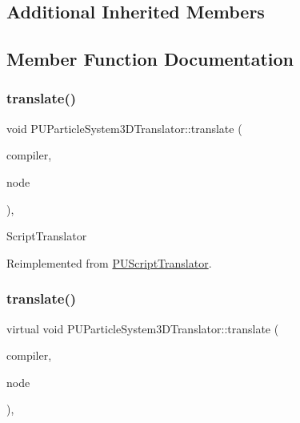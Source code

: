 \subsection*{Additional Inherited Members}


\subsection{Member Function Documentation}
\mbox{\label{classPUParticleSystem3DTranslator_a3ae0aae9a330ba95015c3bea96e8e642}} 
\subsubsection{\texorpdfstring{translate()}{translate()}\hspace{0.1cm}{\footnotesize\ttfamily [1/2]}}
{\footnotesize\ttfamily void P\+U\+Particle\+System3\+D\+Translator\+::translate (\begin{DoxyParamCaption}\item[{\hyperlink{classPUScriptCompiler}{P\+U\+Script\+Compiler} $\ast$}]{compiler,  }\item[{\hyperlink{classPUAbstractNode}{P\+U\+Abstract\+Node} $\ast$}]{node }\end{DoxyParamCaption})\hspace{0.3cm}{\ttfamily [override]}, {\ttfamily [virtual]}}

Script\+Translator 

Reimplemented from \hyperlink{classPUScriptTranslator_a9ff2cdfda9ea8db6fd716e7b69dbe79b}{P\+U\+Script\+Translator}.

\mbox{\label{classPUParticleSystem3DTranslator_a9143639c923068f0d52ad0cd5befd3aa}} 
\subsubsection{\texorpdfstring{translate()}{translate()}\hspace{0.1cm}{\footnotesize\ttfamily [2/2]}}
{\footnotesize\ttfamily virtual void P\+U\+Particle\+System3\+D\+Translator\+::translate (\begin{DoxyParamCaption}\item[{\hyperlink{classPUScriptCompiler}{P\+U\+Script\+Compiler} $\ast$}]{compiler,  }\item[{\hyperlink{classPUAbstractNode}{P\+U\+Abstract\+Node} $\ast$}]{node }\end{DoxyParamCaption})\hspace{0.3cm}{\ttfamily [override]}, {\ttfamily [virtual]}}

